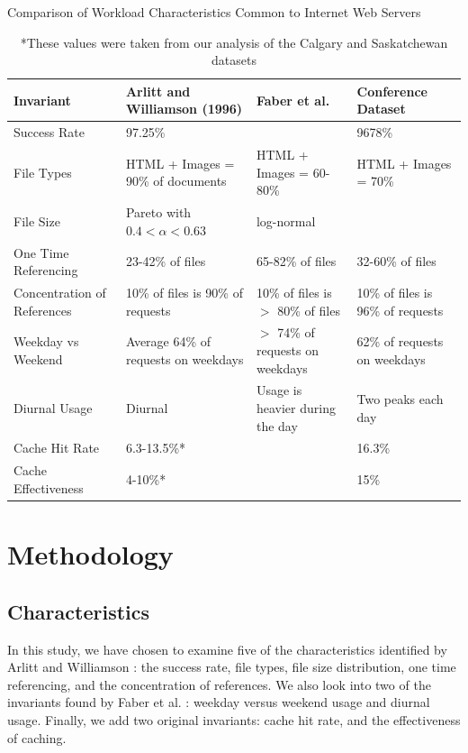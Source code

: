 \documentclass[10pt,conference]{IEEEtran}
\begin{document}
\begin{table}
    \caption{Comparison of Workload Characteristics Common to Internet Web Servers}\label{tab:characteristics}
    \begin{tabular}{| l || l | l | l |}
        \hline
        Invariant & Arlitt and Williamson (1996) & Faber et al. & Conference Dataset\\
        \hline
        Success Rate & 97.25\% &  & 9678\%\\
        File Types & HTML + Images = 90\% of documents & HTML + Images = 60-80\% & HTML + Images = 70\%\\
        File Size & Pareto with $0.4 < \alpha < 0.63$ & log-normal &  \\
        One Time Referencing & 23-42\% of files & 65-82\% of files & 32-60\% of files\\
        Concentration of References & 10\% of files is 90\% of requests & 10\% of files is $>$ 80\% of files & 10\% of files is 96\% of requests\\
        Weekday vs Weekend & Average 64\% of requests on weekdays & $>$ 74\% of requests on weekdays & 62\% of requests on weekdays\\
        Diurnal Usage & Diurnal & Usage is heavier during the day & Two peaks each day\\
        Cache Hit Rate & 6.3-13.5\%* &  & 16.3\%\\
        Cache Effectiveness & 4-10\%* &  & 15\%\\
        \hline
    \end{tabular}
    \caption*{*These values were taken from our analysis of the Calgary and Saskatchewan datasets}
\end{table}

\section{Methodology}\label{methodology}
\subsection{Characteristics}\label{lab:characteristics}
In this study, we have chosen to examine five of the characteristics identified by Arlitt and Williamson \cite{keynote}: the success rate, file types, file size distribution, one time referencing, and the concentration of references. We also look into two of the invariants found by Faber et al. \cite{Faber}: weekday versus weekend usage and diurnal usage. Finally, we add two original invariants: cache hit rate, and the effectiveness of caching.
\end{document}
